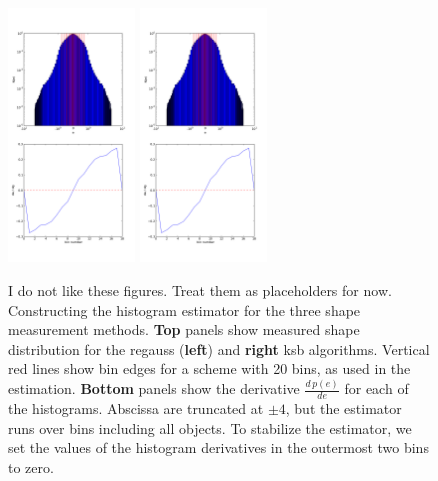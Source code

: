 \documentclass[iop]{emulateapj}
\begin{document}
\begin{figure}
\begin{center}
\includegraphics[width=0.3\textwidth]{./Plots/regauss-opt-shear_plots-prior_derivs.png}
\includegraphics[width=0.3\textwidth]{./Plots/ksb-opt-shear_plots-prior_derivs.png}
\end{center}
\caption{I do not like these figures. Treat them as placeholders for now.\\
  Constructing the histogram estimator for the three shape measurement
  methods. {\bf Top} panels show measured shape distribution for the
  regauss ({\bf left}) and {\bf right} ksb algorithms. Vertical red
  lines show bin edges for a scheme with 20 bins, as used in the
  estimation. {\bf Bottom} panels show the derivative
  $\frac{d\,p(e)}{d{e}}$ for each of the histograms. Abscissa are
  truncated at $\pm 4$, but the estimator runs over bins including all
  objects. To stabilize the estimator, we set the values of the
  histogram derivatives in the outermost two bins to zero.}
\label{fig:estimator}
\end{figure}
\end{document}
